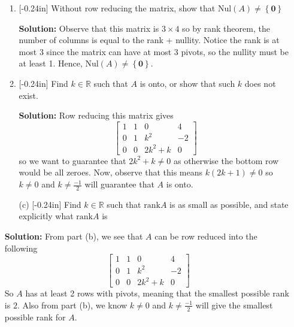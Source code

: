\documentclass[letterpaper,12pt]{article}
\newcommand{\set}[1]{\left\{ #1 \right\}}
\theoremstyle{definition}
\begin{document}
\begin{enumerate}
\item[]
    \begin{enumerate}
        \item\reversemarginpar{}[-0.24in] Without row reducing the matrix, show that $\mathrm{Nul}(A) \neq \set{\mathbf{0}}$
        \begin{mdframed}
            \textbf{Solution:}
            Observe that this matrix is $3\times 4$ so by rank theorem, the number of columns is equal to the rank + nullity. Notice the rank is at most 3 since the matrix can have at most 3 pivots, so the nullity must be at least 1. Hence, $\mathrm{Nul}(A) \neq \set{\mathbf{0}}$.
        \end{mdframed}
        \item\reversemarginpar{}[-0.24in] Find $k\in\mathbb{R}$ such that $A$ is onto, or show that such $k$ does not exist.
         \begin{mdframed}
            \textbf{Solution:}
            Row reducing this matrix gives 
             $$ \begin{bmatrix}
        1 & 1 & 0 & 4 \\
        0 & 1 & k^2 & -2\\
       0& 0& 2k^2+k & 0
    \end{bmatrix}$$
    so we want to guarantee that $2k^2+k \neq 0$ as otherwise the bottom row would be all zeroes. Now, observe that this means $k(2k+1)\neq 0$ so $k \neq 0$ and $k \neq \frac{-1}{2}$ will guarantee that $A$ is onto.
    \end{mdframed}
    \end{enumerate}
\end{enumerate}
\pagebreak
\begin{enumerate}
    \item[] \begin{enumerate}
        \item[(c)]\reversemarginpar{}[-0.24in] Find $k\in\mathbb{R}$ such that $\mathrm{rank}A$ is as small as possible, and state explicitly what $\mathrm{rank}A$ is
    \end{enumerate}
    \begin{mdframed}
        \textbf{Solution:}
        From part (b), we see that $A$ can be row reduced into the following  $$ \begin{bmatrix}
        1 & 1 & 0 & 4 \\
        0 & 1 & k^2 & -2\\
       0& 0& 2k^2+k & 0
    \end{bmatrix}$$
    So $A$ has at least 2 rows with pivots, meaning that the smallest possible rank is $2$. Also from part (b), we know $k \neq 0$ and $k \neq \frac{-1}{2}$ will give the smallest possible rank for $A$.
    \end{mdframed}
\end{enumerate}
\pagebreak
\end{document}
